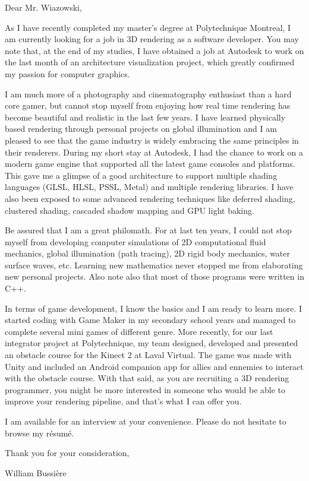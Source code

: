 Dear Mr. Wiazowski,

As I have recently completed my master's degree at Polytechnique Montreal, I am currently looking for a job in 3D rendering as a software developer. You may note that, at the end of my studies, I have obtained a job at Autodesk to work on the last month of an architecture visualization project, which greatly confirmed my passion for computer graphics.

I am much more of a photography and cinematography enthusiast than a hard core gamer, but cannot stop myself from enjoying how real time rendering has become beautiful and realistic in the last few years. I have learned physically based rendering through personal projects on global illumination and I am pleased to see that the game industry is widely embracing the same principles in their renderers. During my short stay at Autodesk, I had the chance to work on a modern game engine that supported all the latest game consoles and platforms. This gave me a glimpse of a good architecture to support multiple shading languages (GLSL, HLSL, PSSL, Metal) and multiple rendering libraries. I have also been exposed to some advanced rendering techniques like deferred shading, clustered shading, cascaded shadow mapping and GPU light baking.

Be assured that I am a great philomath. For at last ten years, I could not stop myself from developing computer simulations of 2D computational fluid mechanics, global illumination (path tracing), 2D rigid body mechanics, water surface waves, etc. Learning new mathematics never stopped me from elaborating new personal projects. Also note also that most of those programs were written in C++.

In terms of game development, I know the basics and I am ready to learn more. I started coding with Game Maker in my secondary school years and managed to complete several mini games of different genre. More recently, for our last integrator project at Polytechnique, my team designed, developed and presented an obstacle course for the Kinect 2 at Laval Virtual. The game was made with Unity and included an Android companion app for allies and ennemies to interact with the obstacle course. With that said, as you are recruiting a 3D rendering programmer, you might be more interested in someone who would be able to improve your rendering pipeline, and that's what I can offer you.

I am available for an interview at your convenience. Please do not hesitate to browse my résumé.

Thank you for your consideration,

William Bussière

